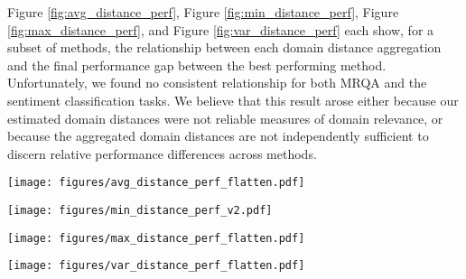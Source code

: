 Figure \ref{fig:avg_distance_perf}, Figure \ref{fig:min_distance_perf}, Figure \ref{fig:max_distance_perf}, and Figure \ref{fig:var_distance_perf} each show, for a subset of methods, the relationship between each domain distance aggregation and the final performance gap between the best performing method. 
Unfortunately, we found no consistent relationship for both MRQA and the sentiment classification tasks. 
We believe that this result arose either because our estimated domain distances were not reliable measures of domain relevance, or because the aggregated domain distances are not independently sufficient to discern relative performance differences across methods.

\begin{figure*}[ht]
  \centering
     \caption*{Figures 4-7: The average domain distance is calculated by finding the distance between 3k examples from $D_T$ and the combined set made from choosing 3k examples from each domain in $D_S$. 
     Since the Wasserstein metric is symmetric, this yields $k$ points for comparison.}
\texttt{[image: figures/avg\_distance\_perf\_flatten.pdf]}
    \caption{\label{fig:avg_distance_perf} Average Wasserstein domain distance vs performance.}
\end{figure*}
\respace
\begin{figure*}[ht]
  \centering
    \texttt{[image: figures/min\_distance\_perf\_v2.pdf]}
    \caption{\label{fig:min_distance_perf} Minimum Wasserstein domain distance vs method performance.}
\end{figure*}
\respace
\begin{figure*}[ht]
  \centering
    \texttt{[image: figures/max\_distance\_perf\_flatten.pdf]}
    \caption{\label{fig:max_distance_perf} Maximum Wasserstein domain distance vs method performance.}
\end{figure*}
\clearpage
\begin{figure*}[ht]
  \centering
    \texttt{[image: figures/var\_distance\_perf\_flatten.pdf]}
    \caption{\label{fig:var_distance_perf} Wasserstein Domain distance variance vs performance.}
\end{figure*}